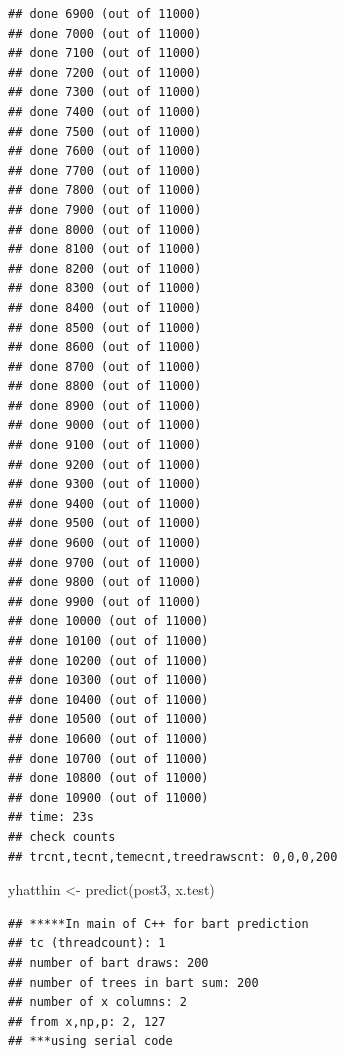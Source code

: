 \documentclass[
]{book}
\newenvironment{Shaded}{\begin{snugshade}}{\end{snugshade}}
\newcommand{\DecValTok}[1]{\textcolor[rgb]{0.00,0.00,0.81}{#1}}
\newcommand{\FunctionTok}[1]{\textcolor[rgb]{0.00,0.00,0.00}{#1}}
\newcommand{\NormalTok}[1]{#1}
\newcommand{\OtherTok}[1]{\textcolor[rgb]{0.56,0.35,0.01}{#1}}
\newcommand{\SpecialCharTok}[1]{\textcolor[rgb]{0.00,0.00,0.00}{#1}}
\newcommand{\StringTok}[1]{\textcolor[rgb]{0.31,0.60,0.02}{#1}}
\begin{document}
\begin{verbatim}
## done 6900 (out of 11000)
## done 7000 (out of 11000)
## done 7100 (out of 11000)
## done 7200 (out of 11000)
## done 7300 (out of 11000)
## done 7400 (out of 11000)
## done 7500 (out of 11000)
## done 7600 (out of 11000)
## done 7700 (out of 11000)
## done 7800 (out of 11000)
## done 7900 (out of 11000)
## done 8000 (out of 11000)
## done 8100 (out of 11000)
## done 8200 (out of 11000)
## done 8300 (out of 11000)
## done 8400 (out of 11000)
## done 8500 (out of 11000)
## done 8600 (out of 11000)
## done 8700 (out of 11000)
## done 8800 (out of 11000)
## done 8900 (out of 11000)
## done 9000 (out of 11000)
## done 9100 (out of 11000)
## done 9200 (out of 11000)
## done 9300 (out of 11000)
## done 9400 (out of 11000)
## done 9500 (out of 11000)
## done 9600 (out of 11000)
## done 9700 (out of 11000)
## done 9800 (out of 11000)
## done 9900 (out of 11000)
## done 10000 (out of 11000)
## done 10100 (out of 11000)
## done 10200 (out of 11000)
## done 10300 (out of 11000)
## done 10400 (out of 11000)
## done 10500 (out of 11000)
## done 10600 (out of 11000)
## done 10700 (out of 11000)
## done 10800 (out of 11000)
## done 10900 (out of 11000)
## time: 23s
## check counts
## trcnt,tecnt,temecnt,treedrawscnt: 0,0,0,200
\end{verbatim}

\begin{Shaded}
\begin{Highlighting}[]
\NormalTok{yhatthin }\OtherTok{\textless{}{-}} \FunctionTok{predict}\NormalTok{(post3, x.test)}
\end{Highlighting}
\end{Shaded}

\begin{verbatim}
## *****In main of C++ for bart prediction
## tc (threadcount): 1
## number of bart draws: 200
## number of trees in bart sum: 200
## number of x columns: 2
## from x,np,p: 2, 127
## ***using serial code
\end{verbatim}

\begin{Shaded}
\end{Shaded}
\end{document}

